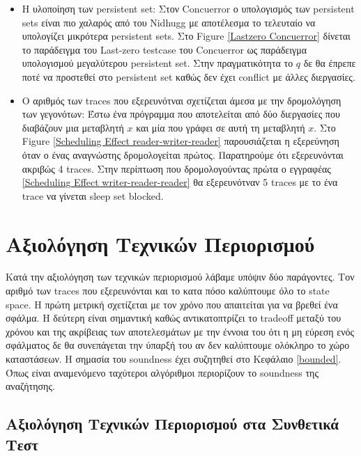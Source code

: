 \begin{itemize}
  \item Η υλοποίηση των persistent set: Στον Concuerror ο υπολογισμός των persistent sets είναι πιο χαλαρός από του
  Nidhugg με αποτέλεσμα το τελευταίο να υπολογίζει μικρότερα persistent sets. Στο Figure \ref{Lastzero Concuerror} 
  δίνεται το παράδειγμα του Last-zero testcase του Concuerror ως παράδειγμα υπολογισμού μεγαλύτερου persistent set. Στην πραγματικότητα
  το $q$ δε θα έπρεπε ποτέ να προστεθεί στο persistent set καθώς δεν έχει conflict με άλλες διεργασίες.

  \item Ο αριθμός των traces που εξερευνότναι σχετίζεται άμεσα με την δρομολόγηση των γεγονότων: Έστω ένα πρόγραμμα που αποτελείται από
      δύο διεργασίες που διαβάζουν μια μεταβλητή $x$ και μία που γράφει σε αυτή τη μεταβλητή $x$. Στο Figure \ref{Scheduling Effect
  reader-writer-reader} παρουσιάζεται η εξερεύνηση όταν ο ένας αναγνώστης δρομολογείται πρώτος. Παρατηρούμε ότι εξερευνόνται ακριβώς
  4 traces. Στην περίπτωση που δρομολογούντας πρώτα ο εγγραφέας \ref{Scheduling Effect
  writer-reader-reader} θα εξερευνότναν 5 traces με το ένα trace να γίνεται sleep set blocked.

\end{itemize}




\section{Αξιολόγηση Τεχνικών Περιορισμού}
Κατά την αξιολόγηση των τεχνικών περιορισμού λάβαμε υπόψιν δύο παράγοντες. Τον αριθμό των traces που εξερευνόνται και το κατα πόσο 
καλύπτουμε όλο το state space. Η πρώτη μετρική σχετίζεται με τον χρόνο που απαιτείται για να βρεθεί ένα σφάλμα. Η δεύτερη είναι 
σημαντική καθώς αντικατοπτρίζει το tradeoff μεταξύ του χρόνου και της ακρίβειας των αποτελεσμάτων με την έννοια του ότι η μη εύρεση ενός
σφάλματος δε θα συνεπάγεται την ύπαρξή του αν δεν καλύπτουμε ολόκληρο το χώρο καταστάσεων.
Η σημασία του soundness έχει συζητηθεί στο Κεφάλαιο \ref{bounded}. Όπως είναι αναμενόμενο ταχύτεροι αλγόριθμοι περιορίζουν το soundness της αναζήτησης.

\subsection{Αξιολόγηση Τεχνικών Περιορισμού στα Συνθετικά Τεστ}

